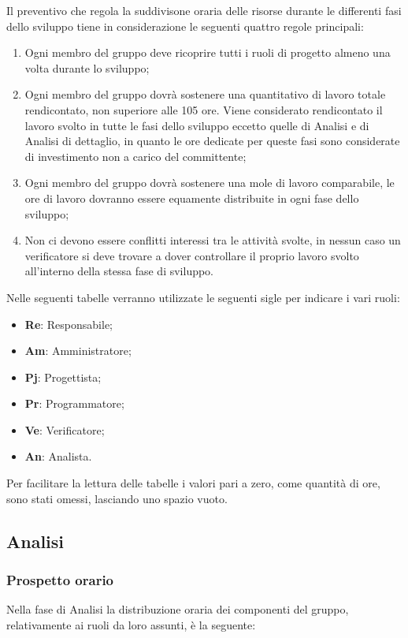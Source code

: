 Il preventivo che regola la suddivisone oraria delle risorse durante le differenti fasi dello sviluppo tiene in considerazione le seguenti quattro regole principali:
\begin{enumerate}
    \item Ogni membro del gruppo deve ricoprire tutti i ruoli di progetto almeno una volta durante lo sviluppo;
    \item Ogni membro del gruppo dovrà sostenere una quantitativo di lavoro totale rendicontato, non superiore alle 105 ore. Viene considerato rendicontato il lavoro svolto in tutte le fasi dello sviluppo eccetto quelle di Analisi e di Analisi di dettaglio, in quanto le ore dedicate per queste fasi sono considerate di investimento non a carico del committente;
    \item Ogni membro del gruppo dovrà sostenere una mole di lavoro comparabile, le ore di lavoro dovranno essere equamente distribuite in ogni fase dello sviluppo;
    \item Non ci devono essere conflitti interessi tra le attività svolte, in nessun caso un verificatore si deve trovare a dover controllare il proprio lavoro svolto all'interno della stessa fase di sviluppo.
\end{enumerate}
Nelle seguenti tabelle verranno utilizzate le seguenti sigle per indicare i vari ruoli:
\begin{itemize}
    \item \textbf{Re}: Responsabile;
    \item \textbf{Am}: Amministratore;
    \item \textbf{Pj}: Progettista;
    \item \textbf{Pr}: Programmatore;
    \item \textbf{Ve}: Verificatore;
    \item \textbf{An}: Analista.
\end{itemize}
Per facilitare la lettura delle tabelle i valori pari a zero, come quantità di ore, sono stati omessi, lasciando uno spazio vuoto.

\newpage
\subsection{Analisi}
\subsubsection{Prospetto orario}
Nella fase di Analisi la distribuzione oraria dei componenti del gruppo, relativamente ai ruoli da loro assunti, è la seguente:

